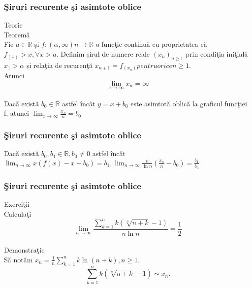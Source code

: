 \documentclass{beamer}
\theoremstyle{plain}
\begin{document}
\frame
{
\frametitle{\c Siruri recurente \c si asimtote oblice}
Teorie
\\ Teorem\u a
\\ Fie \(a\in \mathbb{R}\) și \(f: \left ( \alpha ,\infty  \right )n \to \mathbb{R}\) o func\c tie continu\u a cu proprietatea c\u a \(f_{(x)}> x, \forall x > a\). Definim șirul de numere reale \(\left ( x_{n} \right )_{n\geq 1}\) prin condi\c tia ini\c tial\u a \(x_{1}> \alpha\) și rela\c tia de recuren\c t\u a \(x_{n+1} = f_{\left ( x_{n} \right )} pentru orice  n\geq 1\).
\\ Atunci 
\begin{displaymath}
 \lim_{x \to \infty }x_{n} = \infty
\end{displaymath}
\\ Dac\u a exist\u a \(b_{0}\in \mathbb{R}\) astfel \^ inc\^ at \(y = x + b_{0}\) este asimtot\u a oblic\u a la graficul func\c tiei f, atunci
\(\lim_{x \to \infty }\frac{x_{n}}{n}=b_{0}\)
}
\frame
{
\frametitle{\c Siruri recurente \c si asimtote oblice}
Dac\u a exist\u a \(b_{0}, b_{1}\in \mathbb{R}, b_{0 }\neq 0\) astfel \^ inc\^ at 
\(\lim_{n \to \infty }x\left ( f\left ( x \right )-x-b_{0} \right )= b_{1},
\lim_{n \to \infty } \frac{n}{\ln n}\left ( \frac{x_{n}}{n} -b_{0}\right )=\frac{b_{1}}{b_{0}}\)

}
\frame
{
\frametitle{\c Siruri recurente \c si asimtote oblice}
Exerci\c tii
\\ Calcula\c ti
\begin{displaymath}
 \lim_{n \to \infty }\frac{\sum_{k=1}^{n}k\left ( \sqrt[n]{n+k} -1\right )}{n\ln n } = \frac{1}{2}
\end{displaymath}
\\ Demonstra\c tie 
\\ S\u a not\u am \(x_{n} = \frac{1}{n}\sum_{k=1}^{n} k \ln \left ( n+k \right ), n \geq 1\). 
\begin{displaymath}
 \sum_{k=1}^{n}k\left ( \sqrt[n]{n+k}-1 \right )\sim x_{n}. \label{eq:2.1} \tag{2.1}
\end{displaymath}
}
\frame
\end{document}
